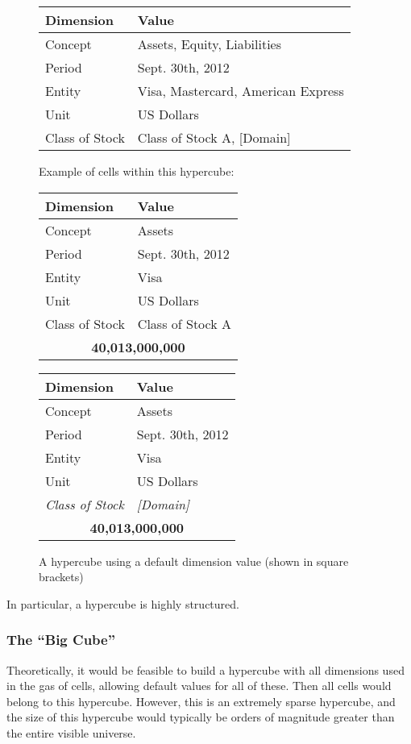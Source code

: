 \documentclass{vldb}
\begin{document}
\begin{figure}
\caption{A hypercube using a default dimension value (shown in square brackets)}
\label{fig-default}
\begin{tabular}{|l|l|}
\hline
Dimension & Value \\
\hline
Concept & Assets, Equity, Liabilities \\
Period & Sept. 30th, 2012 \\
Entity & Visa, Mastercard, American Express \\
Unit & US Dollars \\
Class of Stock & Class of Stock A, [Domain] \\
\hline
\end{tabular}

Example of cells within this hypercube:

\begin{tabular}{|l|l|}
\hline
Dimension & Value \\
\hline
Concept & Assets \\
Period & Sept. 30th, 2012 \\
Entity & Visa \\
Unit & US Dollars \\
Class of Stock & Class of Stock A \\
\hline
\multicolumn{2}{|c|}{\textbf{40,013,000,000}} \\
\hline
\end{tabular}

\begin{tabular}{|l|l|}
\hline
Dimension & Value \\
\hline
Concept & Assets \\
Period & Sept. 30th, 2012 \\
Entity & Visa \\
Unit & US Dollars \\
\emph{Class of Stock} & \emph{[Domain]} \\
\hline
\multicolumn{2}{|c|}{\textbf{40,013,000,000}} \\
\hline
\end{tabular}
\end{figure}

In particular, a hypercube is highly structured.

\subsubsection{The ``Big Cube''}
Theoretically, it would be feasible to build a hypercube with all dimensions used in the gas of cells, allowing default values for all of these. Then all cells would belong to this hypercube. However, this is an extremely sparse hypercube, and the size of this hypercube would typically be orders of magnitude greater than the entire visible universe.
\end{document}
